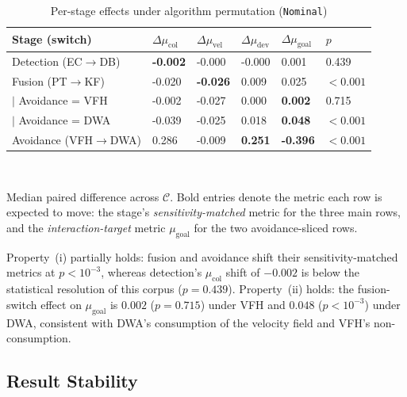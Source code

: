 \documentclass[conference]{IEEEtran}
\begin{document}
\begin{table}[htbp]
    \caption{Per-stage effects under algorithm permutation (\texttt{Nominal})}
    \label{tab:rq2}
    \begin{center}
        \begin{tabular}{|p{2.3cm}|p{0.727cm}|p{0.727cm}|p{0.727cm}|p{0.727cm}|p{0.947cm}|}
            \hline
            \textbf{Stage (switch)} & $\Delta\mu_{\text{col}}$ & $\Delta\mu_{\text{vel}}$ & $\Delta\mu_{\text{dev}}$ & $\Delta\mu_{\text{goal}}$ & $p$ \\
            \hline
 
            Detection (EC$\to$DB)       & \textbf{-0.002} & -0.000 & -0.000 & 0.001 & 0.439 \\
            Fusion (PT$\to$KF)          & -0.020 & \textbf{-0.026} & 0.009 & 0.025 & $<\!0.001$ \\
            $\mid$ Avoidance = VFH    & -0.002 & -0.027 & 0.000 & \textbf{0.002} & 0.715 \\
            $\mid$ Avoidance = DWA    & -0.039 & -0.025 & 0.018 & \textbf{0.048} & $<\!0.001$ \\
            Avoidance (VFH$\to$DWA)     & 0.286 & -0.009 & \textbf{0.251} & \textbf{-0.396} & $<\!0.001$ \\
            \hline
        \end{tabular}
        \\[3pt]
        \raggedright
        \footnotesize
        Median paired difference across $\mathcal{C}$. Bold entries denote the metric each row is expected to move: the stage's \emph{sensitivity-matched} metric for the three main rows, and the \emph{interaction-target} metric $\mu_{\text{goal}}$ for the two avoidance-sliced rows.
    \end{center}
\end{table}
 
Property~(i) partially holds: fusion and avoidance shift their sensitivity-matched metrics at $p<10^{-3}$, whereas detection's $\mu_{\text{col}}$ shift of $-0.002$ is below the statistical resolution of this corpus ($p=0.439$). Property~(ii) holds: the fusion-switch effect on $\mu_{\text{goal}}$ is $0.002$ ($p=0.715$) under VFH and $0.048$ ($p<10^{-3}$) under DWA, consistent with DWA's consumption of the velocity field and VFH's non-consumption. 
 
\subsection{Result Stability}
\label{sec:results-rq3}
 
\end{document}
